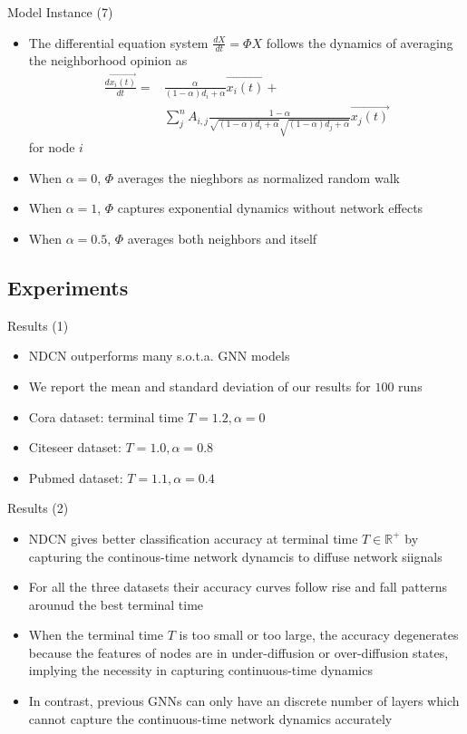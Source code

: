 \documentclass{beamer}
\begin{document}
\begin{frame}{Model Instance (7)}
\begin{itemize}
\item The differential equation system $\frac{dX}{dt}=\Phi X$ follows the dynamics of averaging the neighborhood opinion as\[
\begin{split}
\frac{d\overrightarrow{x_i(t)}}{dt}=&\frac{\alpha}{(1-\alpha)d_i+\alpha}\overrightarrow{x_i(t)}+\\
&\sum_j^n A_{i,j}\frac{1-\alpha}{\sqrt{(1-\alpha)d_i+\alpha}\sqrt{(1-\alpha)d_j+\alpha}}\overrightarrow{x_j(t)}
\end{split}
\]for node $i$
\item When $\alpha=0$, $\Phi$ averages the nieghbors as normalized random walk
\item When $\alpha=1$, $\Phi$ captures exponential dynamics without network effects
\item When $\alpha=0.5$, $\Phi$ averages both neighbors and itself
\end{itemize}
\end{frame}

\subsection{Experiments}
\begin{frame}{Results (1)}
\begin{itemize}
\item NDCN outperforms many s.o.t.a. GNN models
\item We report the mean and standard deviation of our results for $100$ runs
\item Cora dataset: terminal time $T=1.2,\alpha=0$
\item Citeseer dataset: $T=1.0,\alpha=0.8$
\item Pubmed dataset: $T=1.1,\alpha=0.4$
\end{itemize}
\end{frame}

\begin{frame}{Results (2)}
\begin{itemize}
\item NDCN gives better classification accuracy at terminal time $T\in\mathbb{R}^+$ by capturing the continous-time network dynamcis to diffuse network siignals
\item For all the three datasets their accuracy curves follow rise and fall patterns arounud the best terminal time
\item When the terminal time $T$ is too small or too large, the accuracy degenerates because the features of nodes are in under-diffusion or over-diffusion states, implying the necessity in capturing continuous-time dynamics
\item In contrast, previous GNNs can only have an discrete number of layers which cannot capture the continuous-time network dynamics accurately
\end{itemize}
\end{frame}
\end{document}
